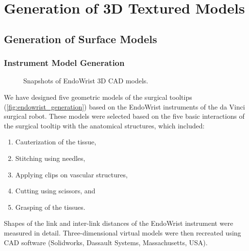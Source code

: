 
\section{Generation of 3D Textured Models}\label{sec:generation_3d}

\subsection{Generation of Surface Models}\label{ssec:generation_surface}

\subsubsection{Instrument Model Generation}\label{sssec:generation_instruments}

\begin{figure}
  \centering%
  \caption{Snapshots of EndoWrist 3D CAD models.}\label{fig:endowrist_generation}
\end{figure}

We have designed five geometric models of the surgical tooltips (\autoref{fig:endowrist_generation}) based on the EndoWrist instruments of the da Vinci surgical robot. These models were selected based on the five basic interactions of the surgical tooltip with the anatomical structures, which included:

\begin{enumerate}
  \item Cauterization of the tissue,
  \item Stitching using needles,
  \item Applying clips on vascular structures,
  \item Cutting using scissors, and
  \item Grasping of the tissues.
\end{enumerate}

Shapes of the link and inter-link distances of the EndoWrist instrument were measured in detail. Three-dimensional virtual models were then recreated using CAD software (Solidworks, Dassault Systems, Massachusetts, USA).

